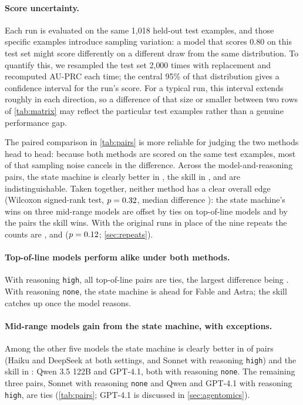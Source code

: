 \paragraph{Score uncertainty.} Each run is evaluated on the same 1,018 held-out test examples, and those specific examples introduce sampling variation: a model that scores 0.80 on this test set might score differently on a different draw from the same distribution. To quantify this, we resampled the test set 2,000 times with replacement and recomputed AU-PRC each time; the central 95\% of that distribution gives a confidence interval for the run's score. For a typical run, this interval extends roughly \CIHalfMed{} in each direction, so a difference of that size or smaller between two rows of \cref{tab:matrix} may reflect the particular test examples rather than a genuine performance gap.

The paired comparison in \cref{tab:pairs} is more reliable for judging the two methods head to head: because both methods are scored on the same test examples, most of that sampling noise cancels in the difference. Across the \WilcoxonN{} model-and-reasoning pairs, the state machine is clearly better in \PairsSm{}, the skill in \PairsSkill{}, and \PairsTie{} are indistinguishable. Taken together, neither method has a clear overall edge (Wilcoxon signed-rank test, $p=0.32$, median difference \MedianDiff{}): the state machine's wins on three mid-range models are offset by ties on top-of-line models and by the pairs the skill wins. With the original runs in place of the nine repeats the counts are \OrigPairsSm{}, \OrigPairsSkill{} and \OrigPairsTie{} ($p=0.12$; \cref{sec:repeats}).

\paragraph{Top-of-line models perform alike under both methods.} With reasoning
\texttt{high}, all \FlagHighTies{} top-of-line pairs are ties, the largest difference being \FlagHighMax. With reasoning
\texttt{none}, the state machine is ahead for Fable and Astra; the
skill catches up once the model reasons.

\paragraph{Mid-range models gain from the state machine, with exceptions.} Among the other five models the state
machine is clearly better in \SmallSm{} of \SmallPairs{} pairs (Haiku and DeepSeek at both settings, and Sonnet with reasoning \texttt{high}) and the
skill in \SmallSkill{}: Qwen 3.5 122B and GPT-4.1, both with reasoning \texttt{none}. The
remaining three pairs, Sonnet with reasoning \texttt{none} and Qwen and GPT-4.1 with reasoning \texttt{high}, are ties
(\cref{tab:pairs}; GPT-4.1 is discussed in \cref{sec:agentomics}).

